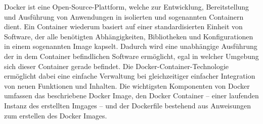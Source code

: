 Docker ist eine Open-Source-Plattform, welche zur Entwicklung, Bereitstellung und Ausführung von Anwendungen in isolierten und sogenannten Containern dient. Ein Container wiederum basiert auf einer standardisierten Einheit von Software, der alle benötigten Abhängigkeiten, Bibliotheken und Konfigurationen in einem sogenannten Image kapselt. Dadurch wird eine unabhängige Ausführung der in dem Container befindlichen Software ermöglicht, egal in welcher Umgebung sich dieser Container gerade befindet.
Die Docker-Container-Technologie ermöglicht dabei eine einfache Verwaltung bei gleichzeitiger einfacher Integration von neuen Funktionen und Inhalten.
Die wichtigsten Komponenten von Docker umfassen das beschriebene Docker Image, den Docker Container – einer laufenden Instanz des erstellten Imgages – und der Dockerfile bestehend aus Anweisungen zum erstellen des Docker Images.
